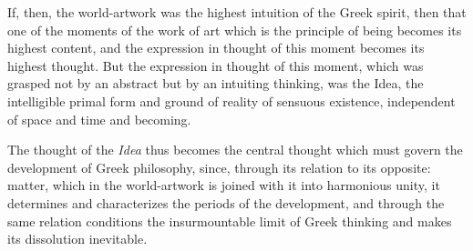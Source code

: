 If, then, the world-artwork was the highest intuition of the Greek spirit,
then that one of the moments of the work of art which is the principle of
being becomes its highest content, and the expression in thought of this
moment becomes its highest thought. But the expression in thought of this
moment, which was grasped not by an abstract but by an intuiting thinking, was
the Idea, the intelligible primal form and ground of reality of sensuous
existence, independent of space and time and becoming.

The thought of the \emph{Idea} thus becomes the central thought which must
govern the development of Greek philosophy, since, through its relation to its
opposite: matter, which in the world-artwork is joined with it into
harmonious unity, it determines and characterizes the periods of the
development, and through the same relation conditions the insurmountable
limit of Greek thinking and makes its dissolution inevitable.

